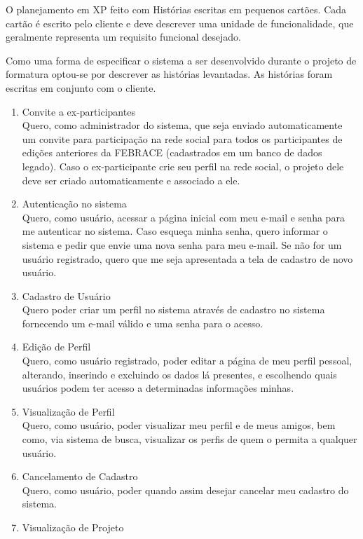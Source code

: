   O planejamento em XP feito com Histórias escritas em pequenos cartões. Cada cartão é escrito pelo cliente e deve descrever uma unidade de funcionalidade, que geralmente representa um requisito funcional desejado\cite{sato07}.

  Como uma forma de especificar o sistema a ser desenvolvido durante o projeto de formatura optou-se por descrever as histórias levantadas. As histórias foram escritas em conjunto com o cliente.

	\begin{enumerate}
    \item Convite a ex-participantes \\
      Quero, como administrador do sistema, que seja enviado automaticamente um convite para participação na rede social para todos os participantes de edições anteriores da FEBRACE (cadastrados em um banco de dados legado). Caso o ex-participante crie seu perfil na rede social, o projeto dele deve ser criado automaticamente e associado a ele.
    \item Autenticação no sistema \\
      Quero, como usuário, acessar a página inicial com meu e-mail e senha para me autenticar no sistema. Caso esqueça minha senha, quero informar o sistema e pedir que envie uma nova senha para meu e-mail. Se não for um usuário registrado, quero que me seja apresentada a tela de cadastro de novo usuário.
    \item Cadastro de Usuário \\
      Quero poder criar um perfil no sistema através de cadastro no sistema fornecendo um e-mail válido e uma senha para o acesso.
    \item Edição de Perfil \\
      Quero, como usuário registrado, poder editar a página de meu perfil pessoal, alterando, inserindo e excluindo os dados lá presentes, e escolhendo quais usuários podem ter acesso a determinadas informações minhas.
    \item Visualização de Perfil \\
      Quero, como usuário, poder visualizar meu perfil e de meus amigos, bem como, via sistema de busca, visualizar os perfis de quem o permita a qualquer usuário.
    \item Cancelamento de Cadastro \\
      Quero, como usuário, poder quando assim desejar cancelar meu cadastro do sistema.
    \item Visualização de Projeto \\

\end{enumerate}
